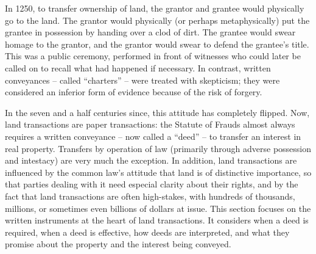 In 1250, to transfer ownership of land, the grantor and grantee would physically
go to the land. The grantor would physically (or perhaps metaphysically) put
the grantee in possession by handing over a clod of dirt. The grantee would
swear homage to the grantor, and the grantor would swear to defend the
grantee's title. This was a public ceremony, performed in front of witnesses
who could later be called on to recall what had happened if necessary. In
contrast, written conveyances -- called ``charters'' -- were treated with
skepticism; they were considered an inferior form of evidence because of the
risk of forgery.

In the seven and a half centuries since, this attitude has completely flipped.
Now, land transactions are paper transactions: the Statute of Frauds almost
always requires a written conveyance -- now called a ``deed'' -- to transfer an
interest in real property. Transfers by operation of law (primarily through
adverse possession and intestacy) are very much the exception. In addition,
land transactions are influenced by the common law's attitude that land is of
distinctive importance, so that parties dealing with it need especial clarity
about their rights, and by the fact that land transactions are often
high-stakes, with hundreds of thousands, millions, or sometimes even billions
of dollars at issue. This section focuses on the written instruments at the
heart of land transactions. It considers when a deed is required, when a deed
is effective, how deeds are interpreted, and what they promise about the
property and the interest being conveyed.


